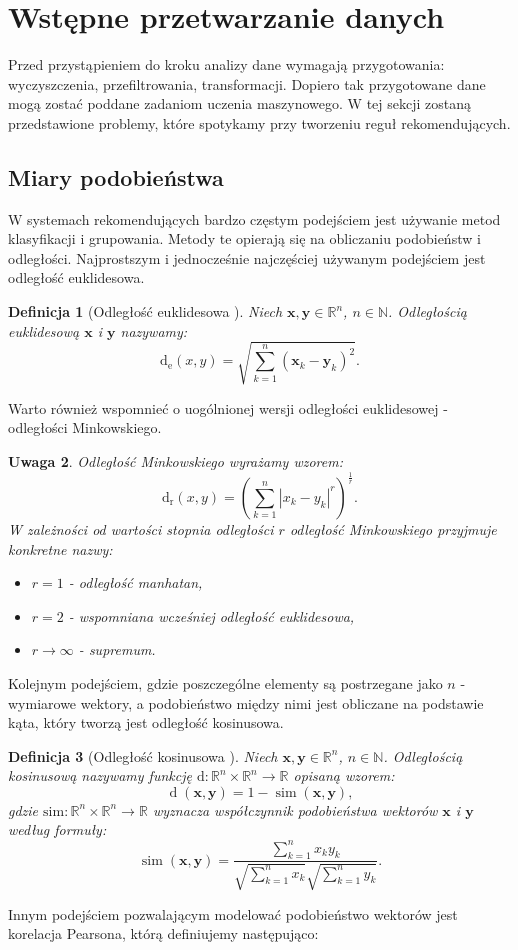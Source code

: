 \documentclass[12pt,a4paper]{report}
\newtheorem{df}{Definicja}[chapter]
\newtheorem{uwaga}[df]{Uwaga}
\newcommand{\setR}{\mathbb{R}}
\newcommand{\setN}{\mathbb{N}}
\newcommand{\similarity}[2]{\operatorname{sim}\left({#1}, {#2} \right)}
\newcommand{\distance}[2]{\operatorname{d}\left({#1}, {#2} \right)}
\newcommand{\distancee}[2]{\operatorname{d_r}\left({#1}, {#2} \right)}
\newcommand{\distanceee}[2]{\operatorname{d_e}\left({#1}, {#2} \right)}
\begin{document}
\section{Wstępne przetwarzanie danych}
Przed przystąpieniem do kroku analizy dane wymagają przygotowania: wyczyszczenia, przefiltrowania, transformacji. Dopiero tak przygotowane dane mogą zostać poddane zadaniom uczenia maszynowego. W tej sekcji zostaną przedstawione problemy, które spotykamy przy tworzeniu reguł rekomendujących.

\subsection{Miary podobieństwa}
W systemach rekomendujących bardzo częstym podejściem jest używanie metod klasyfikacji i grupowania. Metody te opierają się na obliczaniu podobieństw i odległości.
Najprostszym i jednocześnie najczęściej używanym podejściem jest odległość euklidesowa.

\begin{df}[Odległość euklidesowa \citep{rsh}]%

Niech $\mathbf{x},\mathbf{y} \in \setR^n $, $n \in\setN$. Odległością euklidesową $\mathbf{x}$ i $\mathbf{y}$ nazywamy:
$$
\distanceee{x}{y} = \sqrt{\sum_{k=1}^n(\mathbf{x}_k-\mathbf{y}_k)^2}.
$$
\end{df}

Warto również wspomnieć o uogólnionej wersji odległości euklidesowej - odległości Minkowskiego.
\begin{uwaga}
Odległość Minkowskiego wyrażamy wzorem:
$$
\distancee{x}{y} = (\sum_{k=1}^n|x_k-y_k|^r)^{\frac{1}{r}}.
$$
W zależności od wartości stopnia odległości $r$ odległość Minkowskiego przyjmuje konkretne nazwy:
\begin{itemize}
\item $r=1$ - odległość manhatan,
\item $r=2$ - wspomniana wcześniej odległość euklidesowa,
\item $r \to \infty $ - supremum. 
\end{itemize}
\end{uwaga}
Kolejnym podejściem, gdzie poszczególne elementy są postrzegane jako $n$ - wymiarowe wektory, a podobieństwo między nimi jest obliczane na podstawie kąta, który tworzą jest odległość kosinusowa.

\begin{df}[Odległość kosinusowa \citep{rsh}] %
Niech $\mathbf{x},\mathbf{y} \in \setR^n $, $n \in\setN$. Odległością kosinusową nazywamy funkcję $ \mathrm{d}: \setR^n \times \setR^n \to \setR$ opisaną wzorem:
$$
\distance{\mathbf{x}}{\mathbf{y}} = 1 - \similarity{\mathbf{x}}{\mathbf{y}},
$$ 
gdzie $\mathrm{sim}: \setR^n \times \setR^n \to \setR$ wyznacza współczynnik podobieństwa wektorów $\mathbf{x}$ i $\mathbf{y}$ według formuły:
$$
\similarity{\mathbf{x}}{\mathbf{y}} = \frac{\sum_{k=1}^n x_k y_k}{\sqrt{\sum_{k=1}^n x_k}\sqrt{\sum_{k=1}^n y_k}}.
$$
\end{df}
Innym podejściem pozwalającym modelować podobieństwo wektorów jest korelacja Pearsona, którą definiujemy następująco:
\end{document}
